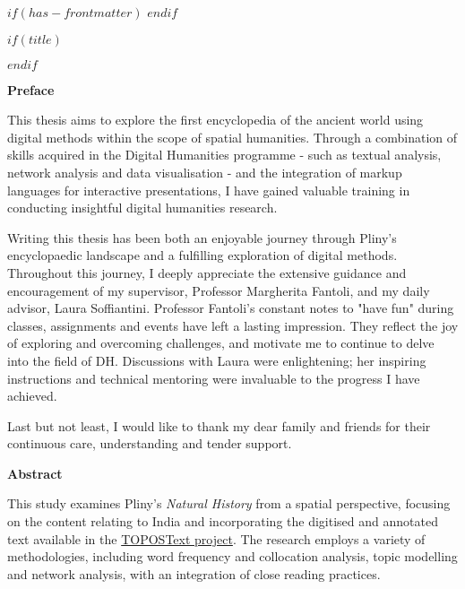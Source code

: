 $if(has-frontmatter)$
\frontmatter
$endif$

$if(title)$
\maketitle
\thispagestyle{empty}
$endif$

\newpage


\raggedright

\Large\textbf{Preface}   

\vspace*{\baselineskip}
\normalsize
\justifying
This thesis aims to explore the first encyclopedia of the ancient world using digital methods within the scope of spatial humanities. Through a combination of skills acquired in the Digital Humanities programme - such as textual analysis, network analysis and data visualisation - and the integration of markup languages for interactive presentations, I have gained valuable training in conducting insightful digital humanities research.

Writing this thesis has been both an enjoyable journey through Pliny's encyclopaedic landscape and a fulfilling exploration of digital methods. Throughout this journey, I deeply appreciate the extensive guidance and encouragement of my supervisor, Professor Margherita Fantoli, and my daily advisor, Laura Soffiantini. Professor Fantoli's constant notes to "have fun" during classes, assignments and events have left a lasting impression. They reflect the joy of exploring and overcoming challenges, and motivate me to continue to delve into the field of DH. Discussions with Laura were enlightening; her inspiring instructions and technical mentoring were invaluable to the progress I have achieved.

Last but not least, I would like to thank my dear family and friends for their continuous care, understanding and tender support.


\newpage



\raggedright

\Large\textbf{Abstract}   

\vspace*{\baselineskip}
\normalsize
\justifying
This study examines Pliny's \textit{Natural History} from a spatial perspective, focusing on the content relating to India and incorporating the digitised and annotated text available in the \href{https://topostext.org/}{TOPOSText project}. The research employs a variety of methodologies, including word frequency and collocation analysis, topic modelling and network analysis, with an integration of close reading practices.
      
